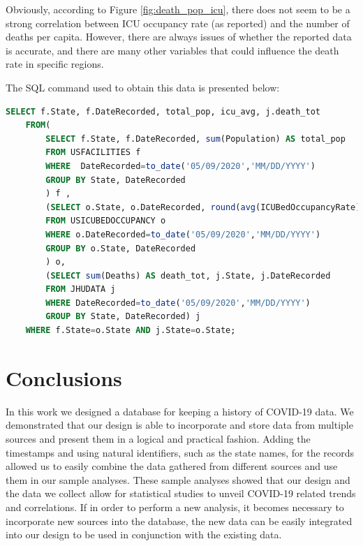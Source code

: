 \documentclass[11pt]{article}
\begin{document}
\noindent
Obviously, according to Figure \ref{fig:death_pop_icu}, there does not seem to be a strong correlation between ICU occupancy rate (as reported) and the number of deaths per capita. However, there are always issues of whether the reported data is accurate, and there are many other variables that could influence the death rate in specific regions.
\pagebreak

\noindent
The SQL command used to obtain this data is presented below:
\begin{lstlisting}[language=SQL,
        deletekeywords={IDENTITY,INT},
        morekeywords={clustered},    
        framesep=10pt,
        framextopmargin=10pt]
    SELECT f.State, f.DateRecorded, total_pop, icu_avg, j.death_tot 
    FROM(
        SELECT f.State, f.DateRecorded, sum(Population) AS total_pop 
        FROM USFACILITIES f 
        WHERE  DateRecorded=to_date('05/09/2020','MM/DD/YYYY')  
        GROUP BY State, DateRecorded
        ) f , 
        (SELECT o.State, o.DateRecorded, round(avg(ICUBedOccupancyRate),3) AS     icu_avg 
        FROM USICUBEDOCCUPANCY o 
        WHERE o.DateRecorded=to_date('05/09/2020','MM/DD/YYYY')  
        GROUP BY o.State, DateRecorded
        ) o, 
        (SELECT sum(Deaths) AS death_tot, j.State, j.DateRecorded 
        FROM JHUDATA j 
        WHERE DateRecorded=to_date('05/09/2020','MM/DD/YYYY')   
        GROUP BY State, DateRecorded) j 
    WHERE f.State=o.State AND j.State=o.State;\end{lstlisting}

\pagebreak

\section{Conclusions}
In this work we designed a database for keeping a history of COVID-19 data. We demonstrated that our design is able to incorporate and store data from multiple sources and present them in a logical and practical fashion. Adding the timestamps and using natural identifiers, such as the state names, for the records allowed us to easily combine the data gathered from different sources and use them in our sample analyses. These sample analyses showed that our design and the data we collect allow for statistical studies to unveil COVID-19 related trends and correlations. If in order to perform a new analysis, it becomes necessary to incorporate new sources into the database, the new data can be easily integrated into our design to be used in conjunction with the existing data.\\
\end{document}
